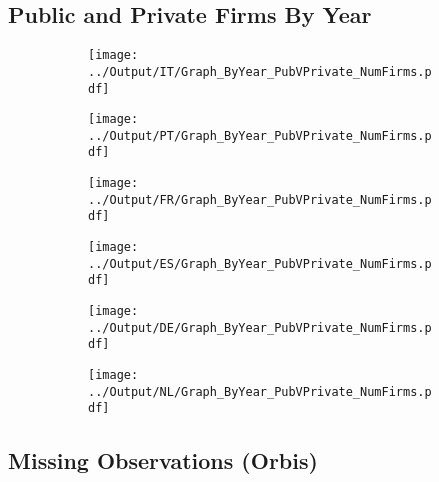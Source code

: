 \documentclass[12pt,notitlepage]{article}
\begin{document}
\subsection{Public and Private Firms By Year}
\begin{figure}[!htpb]
\centering
\begin{subfigure}{.49\textwidth}
    \centering
 \texttt{[image: ../Output/IT/Graph\_ByYear\_PubVPrivate\_NumFirms.pdf]}
\end{subfigure}%
\begin{subfigure}{.49\textwidth}
    \centering
 \texttt{[image: ../Output/PT/Graph\_ByYear\_PubVPrivate\_NumFirms.pdf]}
\end{subfigure}
\begin{subfigure}{.49\textwidth}
    \centering
 \texttt{[image: ../Output/FR/Graph\_ByYear\_PubVPrivate\_NumFirms.pdf]}
\end{subfigure}%
\begin{subfigure}{.49\textwidth}
    \centering
 \texttt{[image: ../Output/ES/Graph\_ByYear\_PubVPrivate\_NumFirms.pdf]}
\end{subfigure}
\begin{subfigure}{.49\textwidth}
    \centering
 \texttt{[image: ../Output/DE/Graph\_ByYear\_PubVPrivate\_NumFirms.pdf]}
\end{subfigure}
\begin{subfigure}{.49\textwidth}
    \centering
 \texttt{[image: ../Output/NL/Graph\_ByYear\_PubVPrivate\_NumFirms.pdf]}
\end{subfigure}
\end{figure}

\clearpage


\subsection{Missing Observations (Orbis)}
\begin{table}[!htpb]
    \centering
\end{table}
\clearpage
\end{document}
